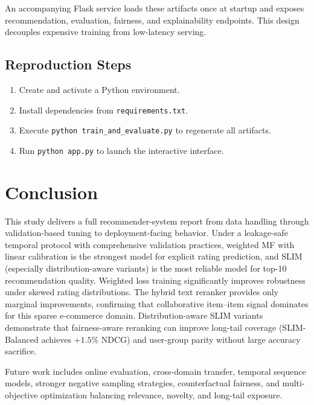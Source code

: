 \documentclass[sigconf,nonacm]{acmart}
\begin{document}
An accompanying Flask service loads these artifacts once at startup and exposes recommendation, evaluation, fairness, and explainability endpoints. This design decouples expensive training from low-latency serving.

\subsection{Reproduction Steps}
\begin{enumerate}
  \item Create and activate a Python environment.
  \item Install dependencies from \texttt{requirements.txt}.
  \item Execute \texttt{python train\_and\_evaluate.py} to regenerate all artifacts.
  \item Run \texttt{python app.py} to launch the interactive interface.
\end{enumerate}

\section{Conclusion}
This study delivers a full recommender-system report from data handling through validation-based tuning to deployment-facing behavior. Under a leakage-safe temporal protocol with comprehensive validation practices, weighted MF with linear calibration is the strongest model for explicit rating prediction, and SLIM (especially distribution-aware variants) is the most reliable model for top-10 recommendation quality. Weighted loss training significantly improves robustness under skewed rating distributions. The hybrid text reranker provides only marginal improvements, confirming that collaborative item--item signal dominates for this sparse e-commerce domain. Distribution-aware SLIM variants demonstrate that fairness-aware reranking can improve long-tail coverage (SLIM-Balanced achieves $+1.5\%$ NDCG) and user-group parity without large accuracy sacrifice.

Future work includes online evaluation, cross-domain transfer, temporal sequence models, stronger negative sampling strategies, counterfactual fairness, and multi-objective optimization balancing relevance, novelty, and long-tail exposure.
\end{document}
